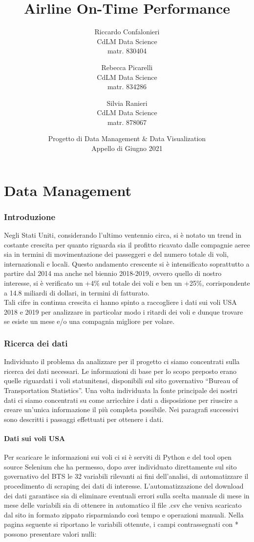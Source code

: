\documentclass[12pt]{article}
\title{\textbf{Airline On-Time Performance}}
\author{
Riccardo Confalonieri \\ CdLM Data Science\\
                matr. 830404 
\and
Rebecca Picarelli \\  CdLM Data Science\\
                matr. 834286 
\and
Silvia Ranieri\\  CdLM Data Science\\
                matr. 878067
}
\date{Progetto di Data Management \& Data Visualization\\Appello di Giugno 2021 }
\begin{document}
\maketitle
\thispagestyle{fancy}

\hypersetup{linkcolor=black}
\tableofcontents

\newpage
\part{Data Management}
\section{Introduzione}
Negli Stati Uniti, considerando l’ultimo ventennio circa, si è notato un trend in costante crescita per quanto riguarda sia il profitto ricavato dalle compagnie aeree sia in termini di movimentazione dei passeggeri e del numero totale di voli, internazionali e locali. Questo andamento crescente si è intensificato soprattutto a partire dal 2014 ma anche nel biennio 2018-2019, ovvero quello di nostro interesse, si è verificato un +4\% sul totale dei voli e ben un +25\%, corrispondente a 14.8 miliardi di dollari, in termini di fatturato.\\
Tali cifre in continua crescita ci hanno spinto a raccogliere i dati sui voli USA 2018 e 2019 per analizzare in particolar modo i ritardi dei voli e dunque trovare se esiste un mese e/o una compagnia migliore per volare.

\section{Ricerca dei dati}
Individuato il problema da analizzare per il progetto ci siamo concentrati sulla ricerca dei dati necessari. Le informazioni di base per lo scopo preposto erano quelle riguardati i voli statunitensi, disponibili sul sito governativo ``Bureau of Transportation Statistics''\cite{BTS}. Una volta individuata la fonte principale dei nostri dati ci siamo concentrati su come arricchire i dati a disposizione per riuscire a creare un'unica informazione il più completa possibile. Nei paragrafi successivi sono descritti i passaggi effettuati per ottenere i dati.

\subsection{Dati sui voli USA}
Per scaricare le informazioni sui voli ci si è serviti di Python e del tool open source Selenium che ha permesso, dopo aver individuato direttamente sul sito governativo del BTS\cite{BTS} le 32 variabili rilevanti ai fini dell’analisi, di automatizzare il procedimento di scraping dei dati di interesse. L’automatizzazione del download dei dati garantisce sia di eliminare eventuali errori sulla scelta manuale di mese in mese delle variabili sia di ottenere in automatico il file .csv che veniva scaricato dal sito in formato zippato risparmiando così tempo e operazioni manuali. Nella pagina seguente si riportano le variabili ottenute, i campi contrassegnati con * possono presentare valori nulli:
\end{document}
